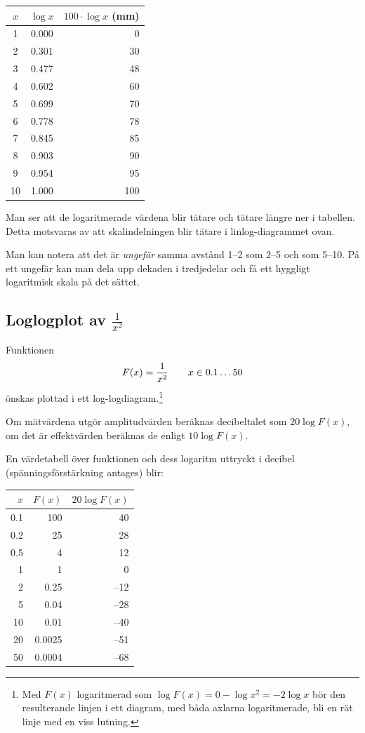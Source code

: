 \documentclass[onepage,swedish,a4paper,12pt]{scrbook}
\begin{document}
\begin{multicols}{2}
\begin{tabular}{ccr}
$x$ & $\log x$ & $100\cdot \log x$ (mm)\\
\hline
1 & 0.000 & 0\\
2& 0.301 & 30\\
3& 0.477 & 48\\
4& 0.602 & 60\\
5& 0.699 & 70\\
6& 0.778 & 78\\
7& 0.845 & 85\\
8& 0.903 & 90\\
9& 0.954 & 95\\
10& 1.000 & 100\\
\end{tabular}

Man ser att de logaritmerade värdena blir tätare och tätare  längre ner i tabellen. Detta motsvaras av att skalindelningen blir tätare i linlog-diagrammet ovan.

Man kan notera att det är \emph{ungefär} samma avstånd  1--2 som  2--5 och som  5--10. På ett ungefär kan man dela upp dekaden i tredjedelar och få ett hyggligt logaritmisk skala på det sättet.

\end{multicols}

\newpage

\subsection*{Loglogplot av $\frac{1}{x^2}$}

\begin{multicols}{2}

Funktionen \[ F(x)=\frac{1}{x^2} \hspace{7mm} x\in {0.1\ldots50}\] önskas plottad i ett log-logdiagram.\footnote{Med $F(x)$ logaritmerad som $\log F(x) = 0 - \log{x^2}=-2 \log {x}$ bör den resulterande linjen i ett diagram, med båda axlarna logaritmerade, bli en rät linje med en viss lutning.}

Om mätvärdena utgör amplitudvärden beräknas decibeltalet som $20 \log F(x)$, om det är effektvärden beräknas de  enligt $10 \log F(x)$.

En värdetabell över funktionen och dess logaritm uttryckt i decibel (spänningsförstärkning antages) blir: 

\begin{tabular}{rrr}
$x$ & $F(x)$ & $20 \log F(x)$\\
\hline
0.1  & 100   & 40 \\
0.2  &25     & 28 \\ 
0.5  &4      & 12 \\
1    &1      & 0 \\
2    &0.25   & --12 \\
5    &0.04   & --28  \\
10   &0.01   & --40  \\
20   &0.0025  & --51 \\
50   &0.0004  & --68 \\
\end{tabular}

\end{multicols}
\end{document}
